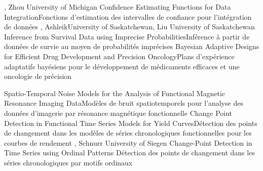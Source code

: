 
{
,  {Zhou}
{University of Michigan}
}
{Confidence Estimating Functions for Data Integration}{Fonctions d’estimation des intervalles de confiance pour l’intégration de données}
{\bubbleE \enspace \screenE}
{
,  {Ashleik}{University of Saskatchewan},  {Liu}
{University of Saskatchewan}
}
{Inference from Survival Data using Imprecise Probabilities}{Inférence à partir de données de survie au moyen de probabilités imprécises}
{\bubbleE \enspace \screenE}
{
}
{Bayesian Adaptive Designs for Efficient Drug Development and Precision Oncology}{Plans d'expérience adaptatifs bayésiens pour le développement de médicaments efficaces et une oncologie de précision}
{\bubbleE \enspace \screenE}


{
}
{Spatio-Temporal Noise Models for the Analysis of Functional Magnetic Resonance Imaging Data}{Modèles de bruit spatiotemporels pour l’analyse des données d’imagerie par résonance magnétique fonctionnelle}
{\bubbleE \enspace \screenE}
{
}
{Change Point Detection in Functional Time Series Models for Yield Curves}{Détection des points de changement dans les modèles de séries chronologiques fonctionnelles pour les courbes de rendement}
{\bubbleE \enspace \screenE}
{
,  {Schnurr}
{University of Siegen}
}
{Change-Point Detection in Time Series using Ordinal Patterns }{Détection des points de changement dans les séries chronologiques par motifs ordinaux}
{\bubbleE \enspace \screenE}


